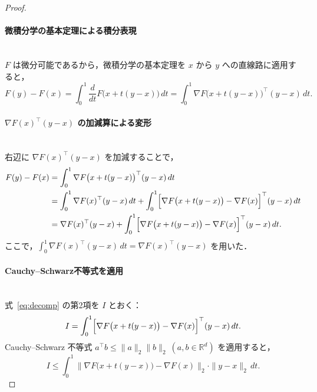 \documentclass[dvipdfmx,a4paper,11pt]{jsarticle}
\begin{document}
\begin{proof}

\paragraph{微積分学の基本定理による積分表現}\ \\

$F$ は微分可能であるから，微積分学の基本定理を $x$ から $y$ への直線路に適用すると，
\begin{equation}
    F(y) - F(x)
    = \int_0^1 \frac{d}{dt} F\bigl(x + t(y-x)\bigr)\, dt
    = \int_0^1 \nabla F\bigl(x + t(y-x)\bigr)^\top (y - x)\, dt.
    \label{eq:ftoc}
\end{equation}

\paragraph{$\nabla F(x)^\top(y-x)$ の加減算による変形}\ \\

右辺に $\nabla F(x)^\top(y-x)$ を加減することで，
\begin{align}
    F(y) - F(x)
    &= \int_0^1 \nabla F\bigl(x + t(y-x)\bigr)^\top (y-x)\, dt \notag \\
    &= \int_0^1 \nabla F(x)^\top (y-x)\, dt
      + \int_0^1 \Bigl[\nabla F\bigl(x + t(y-x)\bigr) - \nabla F(x)\Bigr]^\top (y-x)\, dt \notag \\
    &= \nabla F(x)^\top (y-x)
      + \int_0^1 \Bigl[\nabla F\bigl(x + t(y-x)\bigr) - \nabla F(x)\Bigr]^\top (y-x)\, dt.
    \label{eq:decomp}
\end{align}
ここで，$\int_0^1 \nabla F(x)^\top(y-x)\, dt = \nabla F(x)^\top(y-x)$ を用いた．

\paragraph{Cauchy--Schwarz不等式を適用}\ \\

式~\eqref{eq:decomp} の第2項を $I$ とおく：
\begin{equation}
    I = \int_0^1 \Bigl[\nabla F\bigl(x + t(y-x)\bigr) - \nabla F(x)\Bigr]^\top (y-x)\, dt.
\end{equation}
Cauchy--Schwarz 不等式 $a^\top b \leq \|a\|_2 \|b\|_2\ (a,b\in \mathbb{R}^d)$ を適用すると，
\begin{equation}
    I \leq \int_0^1
        \bigl\|\nabla F\bigl(x + t(y-x)\bigr) - \nabla F(x)\bigr\|_2
        \cdot \|y - x\|_2\, dt.
    \label{eq:CS}
\end{equation}


\end{proof}
\end{document}
